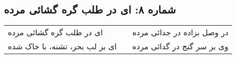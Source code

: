 \begin{center}
\section*{شماره ۸: ای در طلب گره گشائی مرده}
\label{sec:008}
\begin{longtable}{l p{0.5cm} r}
ای در طلب گره گشائی مرده
&&
در وصل بزاده در جدائی مرده
\\
ای بر لب بحر، تشنه، با خاک شده
&&
وی بر سر گنج در گدائی مرده
\\
\end{longtable}
\end{center}
